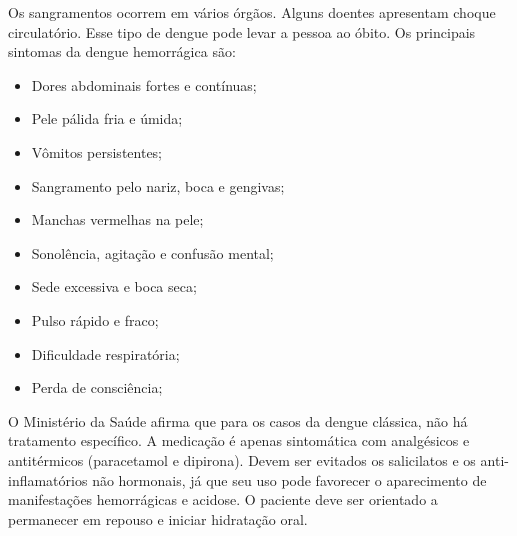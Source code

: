 \documentclass[conference]{IEEEtran}
\begin{document}
\indent Os sangramentos ocorrem em vários órgãos. Alguns doentes apresentam choque circulatório. Esse tipo de dengue pode levar a pessoa ao óbito. Os principais sintomas da dengue hemorrágica são:
\begin{itemize}
    \item Dores abdominais fortes e contínuas;
    \item Pele  pálida fria e úmida;
    \item Vômitos persistentes;
    \item Sangramento pelo nariz, boca e gengivas;
    \item Manchas vermelhas na pele;
    \item Sonolência, agitação e confusão mental;
    \item Sede excessiva e boca seca;
    \item Pulso rápido e fraco;
    \item Dificuldade respiratória;
    \item Perda de consciência;
\end{itemize}

\indent O Ministério da Saúde \cite{brasil2002} afirma que para os casos da dengue clássica, não há tratamento específico. A medicação é apenas sintomática com analgésicos e antitérmicos (paracetamol e dipirona). Devem ser evitados os salicilatos e os anti-inflamatórios não hormonais, já que seu uso pode favorecer o aparecimento de manifestações hemorrágicas e acidose. O paciente deve ser orientado a permanecer em repouso e iniciar hidratação oral. \\

\end{document}
